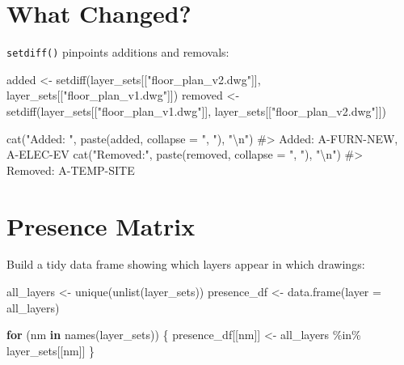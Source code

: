 \documentclass[
  11pt,
  letterpaper,
  DIV=11,
  numbers=noendperiod]{scrreprt}
\newenvironment{Shaded}{\begin{snugshade}}{\end{snugshade}}
\newcommand{\AttributeTok}[1]{\textcolor[rgb]{0.40,0.45,0.13}{#1}}
\newcommand{\CommentTok}[1]{\textcolor[rgb]{0.37,0.37,0.37}{#1}}
\newcommand{\ControlFlowTok}[1]{\textcolor[rgb]{0.00,0.23,0.31}{\textbf{#1}}}
\newcommand{\FunctionTok}[1]{\textcolor[rgb]{0.28,0.35,0.67}{#1}}
\newcommand{\NormalTok}[1]{\textcolor[rgb]{0.00,0.23,0.31}{#1}}
\newcommand{\OtherTok}[1]{\textcolor[rgb]{0.00,0.23,0.31}{#1}}
\newcommand{\SpecialCharTok}[1]{\textcolor[rgb]{0.37,0.37,0.37}{#1}}
\newcommand{\StringTok}[1]{\textcolor[rgb]{0.13,0.47,0.30}{#1}}
\begin{document}
\section{What Changed?}\label{what-changed}

\texttt{setdiff()} pinpoints additions and removals:

\begin{Shaded}
\begin{Highlighting}[]
\NormalTok{added   }\OtherTok{\textless{}{-}} \FunctionTok{setdiff}\NormalTok{(layer\_sets[[}\StringTok{"floor\_plan\_v2.dwg"}\NormalTok{]],}
\NormalTok{                   layer\_sets[[}\StringTok{"floor\_plan\_v1.dwg"}\NormalTok{]])}
\NormalTok{removed }\OtherTok{\textless{}{-}} \FunctionTok{setdiff}\NormalTok{(layer\_sets[[}\StringTok{"floor\_plan\_v1.dwg"}\NormalTok{]],}
\NormalTok{                   layer\_sets[[}\StringTok{"floor\_plan\_v2.dwg"}\NormalTok{]])}

\FunctionTok{cat}\NormalTok{(}\StringTok{"Added:  "}\NormalTok{, }\FunctionTok{paste}\NormalTok{(added,   }\AttributeTok{collapse =} \StringTok{", "}\NormalTok{), }\StringTok{"}\SpecialCharTok{\textbackslash{}n}\StringTok{"}\NormalTok{)}
\CommentTok{\#\textgreater{} Added:   A{-}FURN{-}NEW, A{-}ELEC{-}EV}
\FunctionTok{cat}\NormalTok{(}\StringTok{"Removed:"}\NormalTok{, }\FunctionTok{paste}\NormalTok{(removed, }\AttributeTok{collapse =} \StringTok{", "}\NormalTok{), }\StringTok{"}\SpecialCharTok{\textbackslash{}n}\StringTok{"}\NormalTok{)}
\CommentTok{\#\textgreater{} Removed: A{-}TEMP{-}SITE}
\end{Highlighting}
\end{Shaded}

\section{Presence Matrix}\label{presence-matrix}

Build a tidy data frame showing which layers appear in which drawings:

\begin{Shaded}
\begin{Highlighting}[]
\NormalTok{all\_layers   }\OtherTok{\textless{}{-}} \FunctionTok{unique}\NormalTok{(}\FunctionTok{unlist}\NormalTok{(layer\_sets))}
\NormalTok{presence\_df  }\OtherTok{\textless{}{-}} \FunctionTok{data.frame}\NormalTok{(}\AttributeTok{layer =}\NormalTok{ all\_layers)}

\ControlFlowTok{for}\NormalTok{ (nm }\ControlFlowTok{in} \FunctionTok{names}\NormalTok{(layer\_sets)) \{}
\NormalTok{  presence\_df[[nm]] }\OtherTok{\textless{}{-}}\NormalTok{ all\_layers }\SpecialCharTok{\%in\%}\NormalTok{ layer\_sets[[nm]]}
\NormalTok{\}}
\end{Highlighting}
\end{Shaded}
\end{document}
